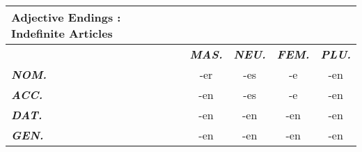 \documentclass[a4paper,12pt]{article}
\begin{document}
\vspace{0.3cm}
\begin{tabular}{l|c c c c}

\toprule
\rowcolor{goethe_green}
\multicolumn{5}{c}
{\color{white} \textbf{Adjective Endings : Indefinite Articles} \color{black}} \\
\midrule



&
\cellcolor{lightgray} \textbf{\textit{MAS. }} &
\cellcolor{lightgray} \textbf{\textit{NEU.}}  &
\cellcolor{lightgray} \textbf{\textit{FEM.}}  &
\cellcolor{lightgray} \textbf{\textit{PLU.}} \\
\midrule

\cellcolor{lightgray} \textbf{\textit{NOM.}} &
\cellcolor{cell-lightgreen}   -er             &
\cellcolor{cell-lightorange} -es             &
\cellcolor{cell-lightred}    -e              &
\cellcolor{cell-lightblue}   -en \\

\cellcolor{lightgray} \textbf{\textit{ACC.}} &
\cellcolor{cell-lightblue}   -en             &
\cellcolor{cell-lightorange} -es             &
\cellcolor{cell-lightred}    -e              &
\cellcolor{cell-lightblue}   -en \\

\cellcolor{lightgray} \textbf{\textit{DAT.}} &
\cellcolor{cell-lightblue} -en               &
\cellcolor{cell-lightblue} -en               &
\cellcolor{cell-lightblue} -en               &
\cellcolor{cell-lightblue} -en \\

\cellcolor{lightgray} \textbf{\textit{GEN.}} &
\cellcolor{cell-lightblue} -en               &
\cellcolor{cell-lightblue} -en               &
\cellcolor{cell-lightblue} -en               &
\cellcolor{cell-lightblue} -en \\









\bottomrule
\end{tabular}
\vspace{0.3cm}
\newline

\end{document}
